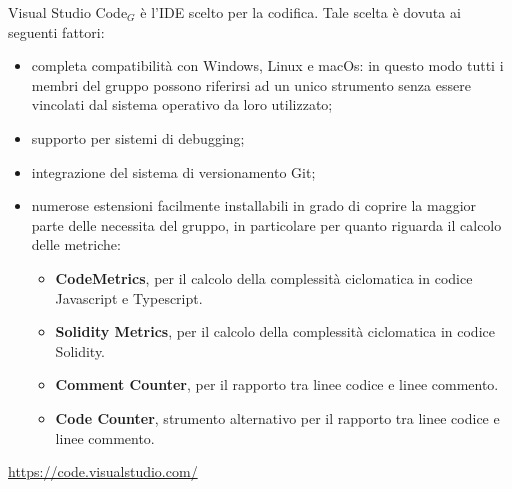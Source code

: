 	Visual Studio Code$_{G}$ è l'IDE scelto per la codifica. Tale scelta è dovuta ai seguenti fattori:
	\begin{itemize}
		\item completa compatibilità con Windows, Linux e macOs: in questo modo tutti i membri del gruppo possono riferirsi ad un unico strumento senza essere vincolati dal sistema operativo da loro utilizzato;
		\item supporto per sistemi di debugging;
		\item integrazione del sistema di versionamento Git;
		\item numerose estensioni facilmente installabili in grado di coprire la maggior parte delle necessita del gruppo, in particolare per quanto riguarda il calcolo delle metriche:
		\begin{itemize}
			\item \textbf{CodeMetrics}, per il calcolo della complessità ciclomatica in codice Javascript e Typescript.
			\item \textbf{Solidity Metrics}, per il calcolo della complessità ciclomatica in codice Solidity.
			\item \textbf{Comment Counter}, per il rapporto tra linee codice e linee commento.
			\item \textbf{Code Counter}, strumento alternativo per il rapporto tra linee codice e linee commento.
		\end{itemize}
	\end{itemize}
	\begin{center}
		\url{https://code.visualstudio.com/}
	\end{center}
